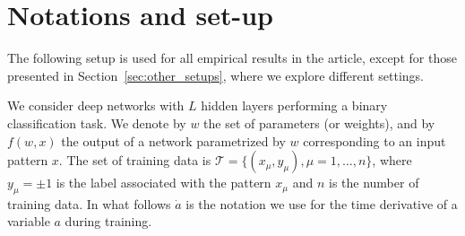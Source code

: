 \documentclass{article}
\renewcommand{\cite}[1]{\citep{#1}}
\newcommand{\mc}{\mathcal}
\newcommand{\eref}[1]{Eq.~(\ref{#1})}
\newcommand{\sref}[1]{Section~\ref{#1}}
\begin{document}






\section{Notations and set-up} \label{sec:setup}

The following setup is used for all empirical results in the article, except for those presented in \sref{sec:other_setups}, where we explore different settings.

We consider deep networks with $L$ hidden layers performing a binary classification task. We denote by $w$ the set of parameters (or weights), and by $f(w,x)$ the output of a network parametrized by $w$ corresponding to an input pattern $x$. The set of training data is $\mc T = \{(x_\mu, y_\mu), \mu=1,\dots,n\}$, where $y_\mu=\pm1$ is the label associated with the pattern $x_\mu$ and $n$ is the number of training data. In what follows $\dot a$ is the notation we use for the time derivative of a variable $a$ during training.
\end{document}

